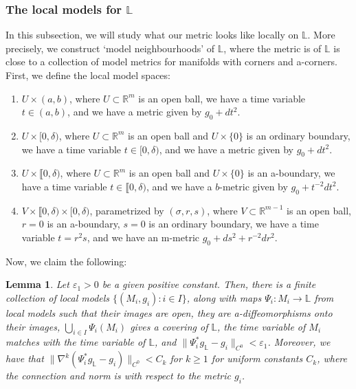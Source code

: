\documentclass[10pt, a4paper]{article}
\theoremstyle{plain}%
\newtheorem{lem}[theorem]{Lemma}
\theoremstyle{definition}
\numberwithin{figure}{section}
\numberwithin{equation}{section}
\newcommand{\bL}{\mathbb{L}}
\newcommand{\bR}{\mathbb{R}}
\newcommand{\rt}{\rightarrow}
\begin{document}
\subsubsection{The local models for $\bL$}\label{subsubsec_localmodels}
In this subsection, we will study what our metric looks like locally on $\bL$. More precisely, we construct `model neighbourhoods' of $\bL$, where the metric is of $\bL$ is close to a collection of model metrics for manifolds with corners and a-corners. First, we define the local model spaces:
\begin{enumerate}
	\item $U\times(a,b)$, where $U\subset \bR^m$ is an open ball, we have a time variable $t\in(a,b)$, and we have a metric given by $g_0 + dt^2$.
		\item  $U\times[0,\delta)$, where $U\subset \bR^m$ is an open ball and $U\times \{0\}$ is an ordinary boundary, we have a time variable $t\in[0,\delta)$, and we have a metric given by $g_0 + dt^2$.
	\item $U\times\llbracket0,\delta)$, where $U\subset \bR^m$ is an open ball and $U\times \{0\}$ is an a-boundary, we have a time variable $t\in \llbracket 0,\delta)$, and we have a $b$-metric given by $g_0 + t^{-2}dt^2$.
	\item $V\times \llbracket0,\delta)\times [0,\delta)$, parametrized by $(\sigma,r,s)$, where $V\subset \bR^{m-1}$ is an open ball, $r=0$ is an a-boundary, $s=0$ is an ordinary boundary, we have a time variable $t=r^2s$, and we have an m-metric $g_0+ds^2+r^{-2}dr^2$.

	
\end{enumerate}
Now, we claim the following: 
\begin{lem}\label{lem_modelneighbourhood}
	Let $\varepsilon_1>0$ be a given positive constant. Then, there is a finite collection of local models $\{(M_i,g_i):i\in I\}$, along with maps $\Psi_i: M_i\rt \bL$ from local models such that their images are open, they are a-diffeomorphisms onto their images, $\bigcup_{i\in I}\Psi_i(M_i)$ gives a covering of $\bL$, the time variable of $M_i$ matches with the time variable of $\bL$, and $\|\Psi_i^*g_\bL-g_i\|_{C^0} < \varepsilon_1$. Moreover, we have that $\|\nabla^k(\Psi_i^* g_\bL-g_i)\|_{C^0} < C_k$ for $k\geq 1$ for uniform constants $C_k$, where the connection and norm is with respect to the metric $g_i$.
\end{lem}
\end{document}
